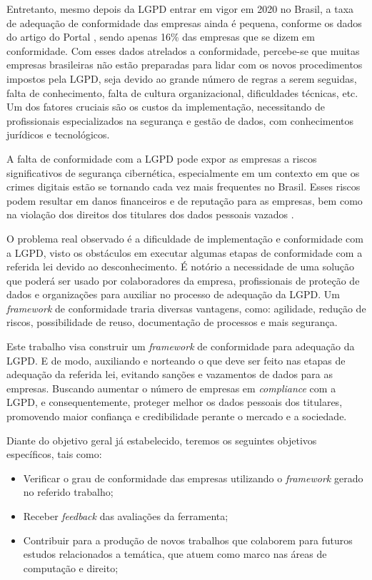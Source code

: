 \documentclass[
	12pt,				%
	openright,			%
	oneside,			%
	a4paper,			%
	english,			%
	french,				%
	spanish,			%
	brazil,				%
	]{abntex2}
\begin{document}
Entretanto, mesmo depois da LGPD entrar em vigor em 2020 no Brasil, a taxa de adequação de conformidade das empresas ainda é pequena, conforme os dados do artigo do Portal , sendo apenas 16\% das empresas que se dizem em conformidade. Com esses dados atrelados a conformidade, percebe-se que muitas empresas brasileiras não estão preparadas para lidar com os novos procedimentos impostos pela LGPD, seja devido ao grande número de regras a serem seguidas, falta de conhecimento, falta de cultura organizacional, dificuldades técnicas, etc. Um dos fatores cruciais são os custos da implementação, necessitando de profissionais especializados na segurança e gestão de dados, com conhecimentos jurídicos e tecnológicos. 

A falta de conformidade com a LGPD pode expor as empresas a riscos significativos de segurança cibernética, especialmente em um contexto em que os crimes digitais estão se tornando cada vez mais frequentes no Brasil. Esses riscos podem resultar em danos financeiros e de reputação para as empresas, bem como na violação dos direitos dos titulares dos dados pessoais vazados  \cite{Diogo2021}.


O problema real observado é a dificuldade de implementação e conformidade com a LGPD, visto os obstáculos em executar algumas etapas de conformidade com a referida lei devido ao desconhecimento. É notório a necessidade de uma solução que poderá ser usado por colaboradores da empresa, profissionais de proteção de dados e organizações para auxiliar no processo de adequação da LGPD. Um \textit{framework} de conformidade traria diversas vantagens, como: agilidade, redução de riscos, possibilidade de reuso, documentação de processos e mais segurança.

Este trabalho visa construir um \textit{framework} de conformidade para adequação da LGPD. E de modo, auxiliando e norteando o que deve ser feito nas etapas de adequação da referida lei, evitando sanções e vazamentos de dados para as empresas. Buscando aumentar o número de empresas em \textit{compliance} com a LGPD, e consequentemente, proteger melhor os dados pessoais dos titulares, promovendo maior confiança e credibilidade perante o mercado e a sociedade.

Diante do objetivo geral já estabelecido, teremos os seguintes objetivos específicos, tais como:
\begin{itemize}
\item Verificar o grau de conformidade das empresas utilizando o \textit{framework} gerado no referido trabalho;
\item Receber \textit{feedback} das avaliações da ferramenta;
\item Contribuir para a produção de novos trabalhos que colaborem para futuros estudos relacionados a temática, que atuem como marco nas áreas de computação e direito;
\end{itemize}
\end{document}
